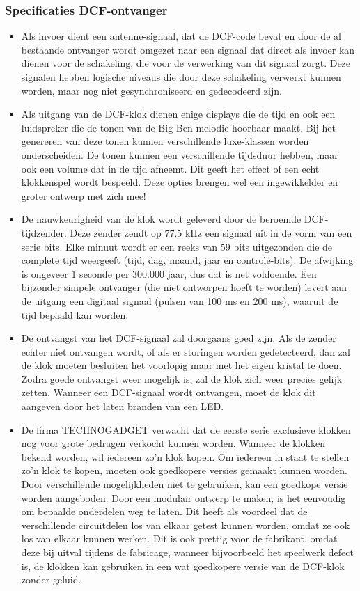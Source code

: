 \subsubsection{Specificaties DCF-ontvanger}
\begin{itemize}
\item Als invoer dient een antenne-signaal, dat de DCF-code bevat en
door de al bestaande ontvanger wordt omgezet naar een signaal
dat direct als invoer kan dienen voor de schakeling, die voor de
verwerking van dit signaal zorgt.
Deze signalen hebben logische niveaus die door deze schakeling
verwerkt kunnen worden, maar 
nog niet gesynchroniseerd en gedecodeerd zijn. 
\item Als uitgang van de DCF-klok dienen enige displays die de
tijd en ook een luidspreker die de tonen
van de Big Ben melodie hoorbaar maakt. Bij het 
genereren van deze tonen kunnen verschillende luxe-klassen worden onderscheiden.
De tonen kunnen een verschillende tijdsduur hebben, maar ook een volume
dat in de tijd afneemt. Dit geeft het effect of een echt klokkenspel
wordt bespeeld. Deze opties brengen wel een ingewikkelder en groter
ontwerp met zich mee!
\item De nauwkeurigheid van de klok wordt geleverd door de 
beroemde DCF-tijdzender.
Deze zender zendt op 77.5 kHz een signaal uit in de vorm van een serie bits.
Elke minuut wordt er een reeks van 59 bits uitgezonden die de complete tijd weergeeft (tijd, dag, maand, jaar en controle-bits).
De afwijking is ongeveer 1 seconde per 300.000 jaar, dus dat is net voldoende.
Een bijzonder simpele ontvanger (die niet ontworpen hoeft te worden) levert aan de uitgang een digitaal signaal (pulsen van 100 ms en 200 ms), waaruit de tijd bepaald kan worden.
\item De ontvangst van het DCF-signaal zal doorgaans goed zijn. 
Als de zender echter niet ontvangen wordt, of als er storingen 
worden gedetecteerd, dan zal de klok moeten besluiten het voorlopig 
maar met het eigen kristal te doen.
Zodra goede ontvangst weer mogelijk is, zal de klok zich weer 
precies gelijk zetten.
Wanneer een DCF-signaal wordt ontvangen, moet de klok dit aangeven 
door het laten branden van een LED.
\item De firma TECHNOGADGET verwacht dat de eerste serie exclusieve klokken
nog voor grote bedragen verkocht kunnen worden. Wanneer de klokken bekend
worden, wil iedereen zo'n klok kopen. Om iedereen in staat te stellen zo'n
klok te kopen, moeten ook goedkopere versies gemaakt kunnen worden.
Door verschillende mogelijkheden niet te gebruiken, kan een goedkope versie worden aangeboden.
Door een modulair ontwerp te maken, is het eenvoudig om bepaalde
onderdelen weg te laten. Dit heeft als voordeel dat
de verschillende circuitdelen los van elkaar getest kunnen worden, omdat ze
ook los van elkaar kunnen werken. Dit is ook prettig voor de fabrikant, omdat
deze bij uitval tijdens de fabricage, wanneer bijvoorbeeld
het speelwerk defect is, de klokken kan gebruiken
in een wat goedkopere versie van de DCF-klok zonder geluid.
\end{itemize}

